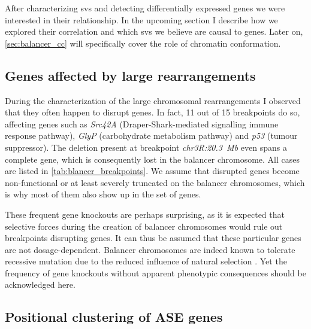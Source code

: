 After characterizing \acp{sv} and detecting differentially expressed genes we
were interested in their relationship. In the upcoming section I describe how we
explored their correlation and which \acp{sv} we believe are causal to \ase
genes. Later on, \cref{sec:balancer_cc} will specifically cover the role of
chromatin conformation.



\subsection{Genes affected by large rearrangements}
\label{sec:balancer_ase_breakpoints}

During the characterization of the large chromosomal rearrangements
I observed that they often happen to disrupt genes. In fact, 11 out
of 15 breakpoints do so, affecting genes such as \textit{Src42A}
(Draper-Shark-mediated signalling immune response pathway), \textit{GlyP}
(carbohydrate metabolism pathway) and \textit{p53} (tumour suppressor). The
deletion present at breakpoint \textit{chr3R:20.3~Mb} even spans a complete
gene, which is consequently lost in the balancer chromosome. All cases are
listed in \cref{tab:blancer_breakpoints}. We assume that disrupted genes become
non-functional or at least severely truncated on the balancer chromosomes,
which is why most of them also show up in the set of \ase genes.

These frequent gene knockouts are perhaps surprising, as it is expected that
selective forces during the creation of balancer chromosomes would rule out
breakpoints disrupting genes. It can thus be assumed that these
particular genes are not dosage-dependent. Balancer chromosomes are indeed known
to tolerate recessive mutation due to the reduced influence of
natural selection \citep{Araye2013}. Yet the frequency of gene knockouts
without apparent phenotypic consequences should be acknowledged here.





\subsection{Positional clustering of ASE genes}
\label{sec:balancer_ase_clustering}

